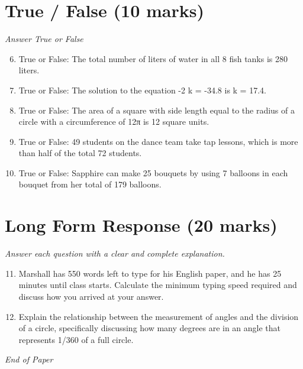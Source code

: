 \documentclass[12pt]{article}
\begin{document}
\section*{True / False (10 marks)}
\textit{Answer True or False}
\begin{enumerate}[label=\arabic*.]
\setcounter{enumi}{5}
\item True or False: The total number of liters of water in all 8 fish tanks is 280 liters.
\item True or False: The solution to the equation -2 k = -34.8 is k = 17.4.
\item True or False: The area of a square with side length equal to the radius of a circle with a circumference of 12π is 12 square units.
\item True or False: 49 students on the dance team take tap lessons, which is more than half of the total 72 students.
\item True or False: Sapphire can make 25 bouquets by using 7 balloons in each bouquet from her total of 179 balloons.
\end{enumerate}

\section*{Long Form Response (20 marks)}
\textit{Answer each question with a clear and complete explanation.}
\begin{enumerate}[label=\arabic*.]
\setcounter{enumi}{10}
\item Marshall has 550 words left to type for his English paper, and he has 25 minutes until class starts. Calculate the minimum typing speed required and discuss how you arrived at your answer.
\item Explain the relationship between the measurement of angles and the division of a circle, specifically discussing how many degrees are in an angle that represents 1/360 of a full circle.
\end{enumerate}

\vfill
\noindent\textit{End of Paper}
\end{document}
